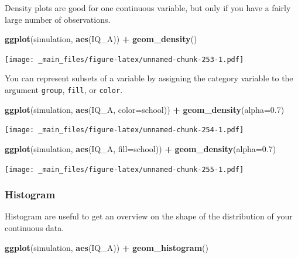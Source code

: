 \documentclass[
]{scrartcl}
\newenvironment{Shaded}{\begin{snugshade}}{\end{snugshade}}
\newcommand{\AttributeTok}[1]{\textcolor[rgb]{0.13,0.29,0.53}{#1}}
\newcommand{\FloatTok}[1]{\textcolor[rgb]{0.00,0.00,0.81}{#1}}
\newcommand{\FunctionTok}[1]{\textcolor[rgb]{0.13,0.29,0.53}{\textbf{#1}}}
\newcommand{\NormalTok}[1]{#1}
\newcommand{\SpecialCharTok}[1]{\textcolor[rgb]{0.81,0.36,0.00}{\textbf{#1}}}
\begin{document}
Density plots are good for one continuous variable, but only if you have a fairly large number of observations.

\begin{Shaded}
\begin{Highlighting}[]
\FunctionTok{ggplot}\NormalTok{(simulation, }\FunctionTok{aes}\NormalTok{(IQ\_A)) }\SpecialCharTok{+}
        \FunctionTok{geom\_density}\NormalTok{()}
\end{Highlighting}
\end{Shaded}

\texttt{[image: \_main\_files/figure-latex/unnamed-chunk-253-1.pdf]}

You can represent subsets of a variable by assigning the category variable to the argument \texttt{group}, \texttt{fill}, or \texttt{color}.

\begin{Shaded}
\begin{Highlighting}[]
\FunctionTok{ggplot}\NormalTok{(simulation, }\FunctionTok{aes}\NormalTok{(IQ\_A, }\AttributeTok{color=}\NormalTok{school)) }\SpecialCharTok{+}
        \FunctionTok{geom\_density}\NormalTok{(}\AttributeTok{alpha=}\FloatTok{0.7}\NormalTok{)}
\end{Highlighting}
\end{Shaded}

\texttt{[image: \_main\_files/figure-latex/unnamed-chunk-254-1.pdf]}

\begin{Shaded}
\begin{Highlighting}[]
\FunctionTok{ggplot}\NormalTok{(simulation, }\FunctionTok{aes}\NormalTok{(IQ\_A, }\AttributeTok{fill=}\NormalTok{school)) }\SpecialCharTok{+}
        \FunctionTok{geom\_density}\NormalTok{(}\AttributeTok{alpha=}\FloatTok{0.7}\NormalTok{)}
\end{Highlighting}
\end{Shaded}

\texttt{[image: \_main\_files/figure-latex/unnamed-chunk-255-1.pdf]}

\subsubsection{Histogram}\label{histogram}

Histogram are useful to get an overview on the shape of the distribution of your continuous data.

\begin{Shaded}
\begin{Highlighting}[]
\FunctionTok{ggplot}\NormalTok{(simulation, }\FunctionTok{aes}\NormalTok{(IQ\_A)) }\SpecialCharTok{+}
        \FunctionTok{geom\_histogram}\NormalTok{()}
\end{Highlighting}
\end{Shaded}
\end{document}
